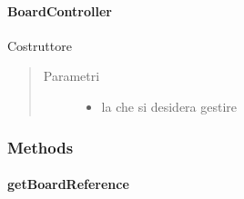 \documentclass[letterpaper,10pt,italian,openany,oneside]{sphinxmanual}
\begin{document}
\paragraph{BoardController}
\label{\detokenize{source/it/unicam/cs/pa/mastermind/gamecore/BoardController:id1}}

\begin{fulllineitems}
\label{\detokenize{source/it/unicam/cs/pa/mastermind/gamecore/BoardController:it.unicam.cs.pa.mastermind.gamecore.BoardController.BoardController(BoardModel)}}
Costruttore
\begin{quote}\begin{description}
\item[{Parametri}] \leavevmode\begin{itemize}
\item {} 
 \textendash{} la  che si desidera gestire

\end{itemize}

\end{description}\end{quote}

\end{fulllineitems}



\subsubsection{Methods}
\label{\detokenize{source/it/unicam/cs/pa/mastermind/gamecore/BoardController:methods}}

\paragraph{getBoardReference}
\label{\detokenize{source/it/unicam/cs/pa/mastermind/gamecore/BoardController:getboardreference}}
\end{document}
